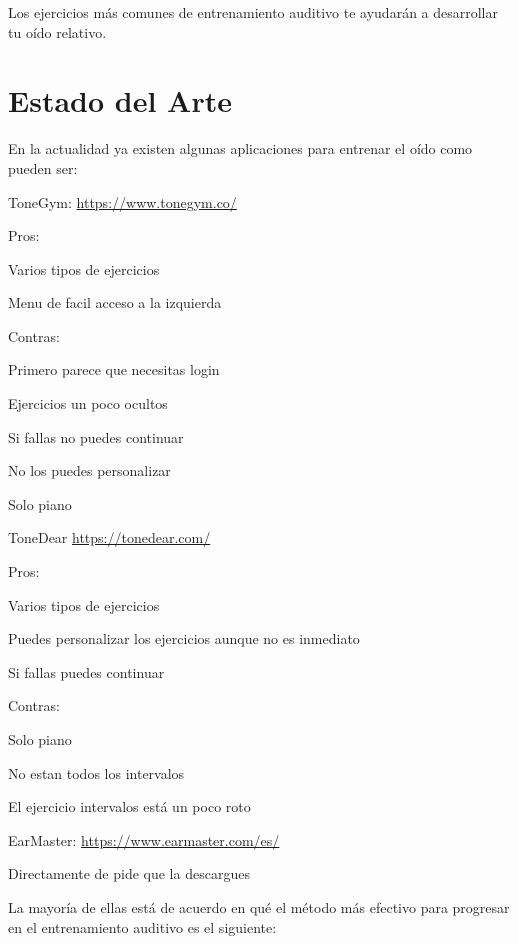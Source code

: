 \documentclass[12pt,twoside,titlepage]{report}
\begin{document}
Los ejercicios más comunes de entrenamiento auditivo te ayudarán a desarrollar tu oído relativo.

\section{Estado del Arte}

En la actualidad ya existen algunas aplicaciones para entrenar el oído como pueden ser:

ToneGym: \url{https://www.tonegym.co/}

Pros:

Varios tipos de ejercicios

Menu de facil acceso a la izquierda

Contras:

Primero parece que necesitas login

Ejercicios un poco ocultos

Si fallas no puedes continuar

No los puedes personalizar

Solo piano

ToneDear \url{https://tonedear.com/}

Pros:

Varios tipos de ejercicios

Puedes personalizar los ejercicios aunque no es inmediato

Si fallas puedes continuar

Contras:

Solo piano

No estan todos los intervalos

El ejercicio intervalos está un poco roto

EarMaster: \url{https://www.earmaster.com/es/}

Directamente de pide que la descargues

La mayoría de ellas está de acuerdo en qué el método más efectivo para progresar en el entrenamiento auditivo es el siguiente:
\end{document}
